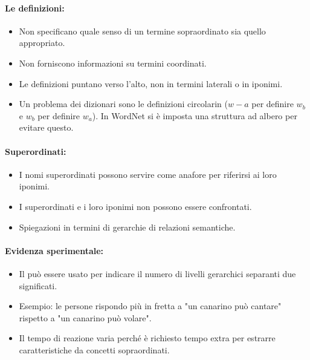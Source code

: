 \paragraph{Le definizioni:}

\begin{itemize}
  \item Non specificano quale senso di un termine sopraordinato sia quello appropriato. 
  \item Non forniscono informazioni su termini coordinati. 
  \item Le definizioni puntano verso l'alto, non in termini laterali o in iponimi. 
  \item Un problema dei dizionari sono le definizioni circolarin ($w-a$ per definire $w_b$ e $w_b$ per definire $w_a$). In WordNet si è imposta una struttura ad albero per evitare questo.
\end{itemize}


\paragraph{Superordinati:}

\begin{itemize}
  \item I nomi superordinati possono servire come anafore per riferirsi ai loro iponimi. 
  \item I superordinati e i loro iponimi non possono essere confrontati. 
  \item Spiegazioni in termini di gerarchie di relazioni semantiche.
\end{itemize}

\paragraph{Evidenza sperimentale:}

\begin{itemize}
  \item Il  può essere usato per indicare il numero di livelli gerarchici separanti due significati. 
  \item Esempio: le persone rispondo più in fretta a "un canarino può cantare" rispetto a "un canarino può volare". 
  \item Il tempo di reazione varia perché è richiesto tempo extra per estrarre caratteristiche da concetti sopraordinati.
\end{itemize}

